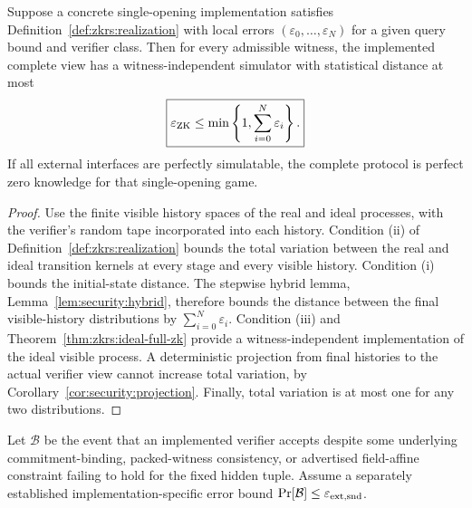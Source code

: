 \begin{theorem}\label{thm:zkrs:conditional-zk}
Suppose a concrete single-opening implementation satisfies
Definition~\ref{def:zkrs:realization} with local errors
$(\varepsilon_0,\ldots,\varepsilon_N)$
for a given query bound and verifier class.
Then for every admissible witness,
the implemented complete view has a witness-independent
simulator with statistical distance at most
\[
 \boxed{
 \varepsilon_{\rm ZK}\leq
 \min\left\{1,\sum_{i=0}^{N}\varepsilon_i\right\}.
 }
\]
If all external interfaces are perfectly simulatable,
the complete protocol is perfect zero knowledge for
that single-opening game.
\end{theorem}
\begin{proof}
Use the finite visible history spaces of the
real and ideal processes, with the verifier's
random tape incorporated into each history.
Condition (ii) of
Definition~\ref{def:zkrs:realization}
bounds the total variation between the real
and ideal transition kernels at every stage
and every visible history.
Condition (i) bounds the initial-state
distance. The stepwise hybrid lemma,
Lemma~\ref{lem:security:hybrid},
therefore bounds the distance between the
final visible-history distributions by
$\sum_{i=0}^{N}\varepsilon_i$.
Condition (iii) and
Theorem~\ref{thm:zkrs:ideal-full-zk}
provide a witness-independent implementation
of the ideal visible process.
A deterministic projection from final
histories to the actual verifier view
cannot increase total variation, by
Corollary~\ref{cor:security:projection}.
Finally, total variation is at most
one for any two distributions.
\end{proof}

\begin{definition}\label{def:zkrs:sound-failure}
Let $\mathcal B$ be the event that an
implemented verifier accepts despite
some underlying commitment-binding,
packed-witness consistency, or advertised
field-affine constraint failing to hold
for the fixed hidden tuple.
Assume a separately established
implementation-specific error bound
$\Pr[\mathcal B]\leq\varepsilon_{\rm ext,snd}$.
\end{definition}

